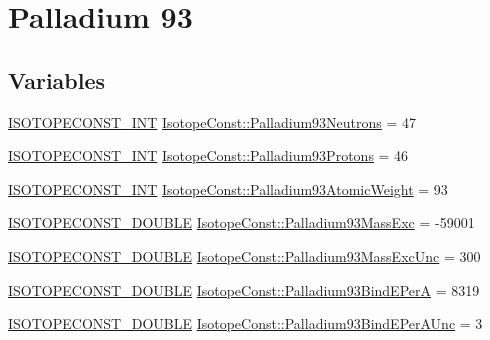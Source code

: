 \hypertarget{group___isotope_const-_palladium-_pd93}{}\section{Palladium 93}
\label{group___isotope_const-_palladium-_pd93}
\subsection*{Variables}
\begin{DoxyCompactItemize}
\item 
\mbox{\hyperlink{group___isotope_const-_macros_ga5f18360b3e99483a35c32d789e62621c}{I\+S\+O\+T\+O\+P\+E\+C\+O\+N\+S\+T\+\_\+\+I\+NT}} \mbox{\hyperlink{group___isotope_const-_palladium-_pd93_gae43e32fdca16441b94572cf927f86f2b}{Isotope\+Const\+::\+Palladium93\+Neutrons}} = 47
\item 
\mbox{\hyperlink{group___isotope_const-_macros_ga5f18360b3e99483a35c32d789e62621c}{I\+S\+O\+T\+O\+P\+E\+C\+O\+N\+S\+T\+\_\+\+I\+NT}} \mbox{\hyperlink{group___isotope_const-_palladium-_pd93_ga6ad8e441a9bb8b9d152a0adb295f9fc2}{Isotope\+Const\+::\+Palladium93\+Protons}} = 46
\item 
\mbox{\hyperlink{group___isotope_const-_macros_ga5f18360b3e99483a35c32d789e62621c}{I\+S\+O\+T\+O\+P\+E\+C\+O\+N\+S\+T\+\_\+\+I\+NT}} \mbox{\hyperlink{group___isotope_const-_palladium-_pd93_ga292ee99c6077ce2a90415f98c3b05d04}{Isotope\+Const\+::\+Palladium93\+Atomic\+Weight}} = 93
\item 
\mbox{\hyperlink{group___isotope_const-_macros_ga8f45a7272ce02c0b4c65c44636ed719a}{I\+S\+O\+T\+O\+P\+E\+C\+O\+N\+S\+T\+\_\+\+D\+O\+U\+B\+LE}} \mbox{\hyperlink{group___isotope_const-_palladium-_pd93_ga879569695843e6a7f2b037545846f21f}{Isotope\+Const\+::\+Palladium93\+Mass\+Exc}} = -\/59001
\item 
\mbox{\hyperlink{group___isotope_const-_macros_ga8f45a7272ce02c0b4c65c44636ed719a}{I\+S\+O\+T\+O\+P\+E\+C\+O\+N\+S\+T\+\_\+\+D\+O\+U\+B\+LE}} \mbox{\hyperlink{group___isotope_const-_palladium-_pd93_gabb1f242a839294ba1043fc100eb55d07}{Isotope\+Const\+::\+Palladium93\+Mass\+Exc\+Unc}} = 300
\item 
\mbox{\hyperlink{group___isotope_const-_macros_ga8f45a7272ce02c0b4c65c44636ed719a}{I\+S\+O\+T\+O\+P\+E\+C\+O\+N\+S\+T\+\_\+\+D\+O\+U\+B\+LE}} \mbox{\hyperlink{group___isotope_const-_palladium-_pd93_ga83d5b5748a118eb8a2d2ba650d7d6d70}{Isotope\+Const\+::\+Palladium93\+Bind\+E\+PerA}} = 8319
\item 
\mbox{\hyperlink{group___isotope_const-_macros_ga8f45a7272ce02c0b4c65c44636ed719a}{I\+S\+O\+T\+O\+P\+E\+C\+O\+N\+S\+T\+\_\+\+D\+O\+U\+B\+LE}} \mbox{\hyperlink{group___isotope_const-_palladium-_pd93_ga01ca566af2d9a34b4cd63166faa177eb}{Isotope\+Const\+::\+Palladium93\+Bind\+E\+Per\+A\+Unc}} = 3

\end{DoxyCompactItemize}
